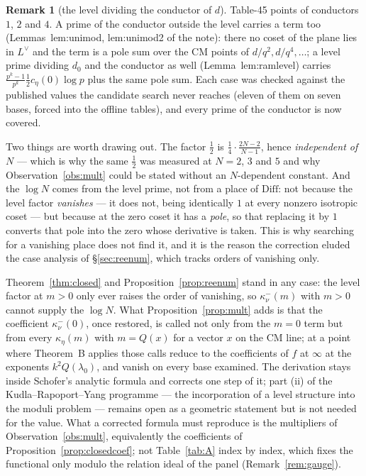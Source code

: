 \documentclass[11pt,reqno]{amsart}
\theoremstyle{plain}
\theoremstyle{definition}
\newtheorem{remark}[theorem]{Remark}
\begin{document}
\begin{remark}[the level dividing the conductor of $d$]
Table-45 points of conductors $1$, $2$ and $4$. A prime of the conductor outside the level carries a
term too (Lemmas~lem:unimod, lem:unimod2 of the note): there no coset of the plane lies in $L^\vee$ and
the term is a pole sum over the CM points of $d/q^2,d/q^4,\dots$; a level prime dividing $d_0$ and the
conductor as well (Lemma~lem:ramlevel) carries $\tfrac{p^k-1}{p^k}\tfrac12c_\eta(0)\log p$ plus the same
pole sum. Each case was checked against the published values the candidate search never reaches
(eleven of them on seven bases, forced into the offline tables), and every prime of the conductor is
now covered.
\end{remark}
Two things are worth drawing out. The factor $\tfrac12$ is
$\tfrac14\cdot\tfrac{2N-2}{N-1}$, hence \emph{independent of $N$} --- which is why the same
$\tfrac12$ was measured at $N=2$, $3$ and $5$ and why Observation~\ref{obs:mult} could be stated
without an $N$-dependent constant. And the $\log N$ comes from the level prime, not from a place of
$\mathrm{Diff}$: not because the level factor \emph{vanishes} --- it does not, being identically
$1$ at every nonzero isotropic coset --- but because at the zero coset it has a \emph{pole}, so
that replacing it by $1$ converts that pole into the zero whose derivative is taken. This is why
searching for a vanishing place does not find it, and it is the reason the correction eluded the
case analysis of \S\ref{sec:reenum}, which tracks orders of vanishing only.

Theorem~\ref{thm:closed} and Proposition~\ref{prop:reenum} stand in any case: the level factor at
$m>0$ only ever raises the order of vanishing, so $\kappa^-_\nu(m)$ with $m>0$ cannot supply the
$\log N$. What Proposition~\ref{prop:mult} adds is that the coefficient $\kappa^-_\nu(0)$, once
restored, is called not only from the $m=0$ term but from every $\kappa_\eta(m)$ with $m=Q(x)$
for a vector $x$ on the CM line; at a point where Theorem~B applies those calls reduce to the
coefficients of $f$ at $\infty$ at the exponents $k^2Q(\lambda_0)$, and vanish on every base
examined. The derivation stays inside Schofer's analytic formula and corrects one step of it; part
(ii) of the Kudla--Rapoport--Yang programme --- the incorporation of a level structure into the
moduli problem --- remains open as a geometric statement but is not needed for the value. What a
corrected formula must reproduce is the multipliers of Observation~\ref{obs:mult}, equivalently
the coefficients of Proposition~\ref{prop:closedcoef}; not Table~\ref{tab:A} index by index, which
fixes the functional only modulo the relation ideal of the panel (Remark~\ref{rem:gauge}).
\end{document}

